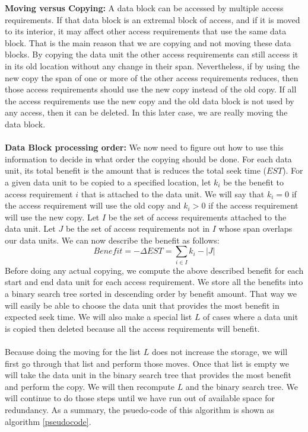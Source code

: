 \documentclass[conference]{acmsiggraph}
\begin{document}
{\bf Moving versus Copying:} A data block can be accessed by multiple access requirements. If that data block is an extremal block of access, and if it is moved to its interior, it may affect other access requirements that use the same data block. That is the main reason that we are copying and not moving these data blocks. By copying the data unit the other access requirements can still access it in its old location without any change in their span. Nevertheless, if by using the new copy the span of one or more of the other access requirements reduces, then those access requirements should use the new copy instead of the old copy. If all the access requirements use the new copy and the old data block is not used by any access, then it can be deleted. In this later case, we are really moving the data block. \\
\\
{\bf Data Block processing order:} We now need to figure out how to use this information to decide in what order the copying should be done. For each data unit, its total benefit is the amount that is reduces the total seek time ($EST$). For a given data unit to be copied to a specified location, let $k_i$ be the benefit to access requirement $i$ that is attached to the data unit. We will say that $k_i=0$ if the access requirement will use the old copy and $k_i>0$ if the access requirement will use the new copy. Let $I$ be the set of access requirements attached to the data unit. Let $J$ be the set of access requirements not in $I$ whose span overlaps our data units. We can now describe the benefit as follows:
\[
Benefit = -\Delta EST = \sum_{i \in I} k_i - |J|
\]
Before doing any actual copying, we compute the above described benefit for each start and end data unit for each access requirement. We store all the benefits into a binary search tree sorted in descending order by benefit amount. That way we will easily be able to choose the data unit that provides the most benefit in expected seek time. We will also make a special list $L$ of cases where a data unit is copied then deleted because all the access requirements will benefit. \\
\\
Because doing the moving for the list $L$ does not increase the storage, we will first go through that list and perform those moves. Once that list is empty we will take the data unit in the binary search tree that provides the most benefit and perform the copy. We will then recompute $L$ and the binary search tree. We will continue to do those steps until we have run out of available space for redundancy. As a summary, the psuedo-code of this algorithm is shown as algorithm \ref{pseudocode}.
\end{document}
